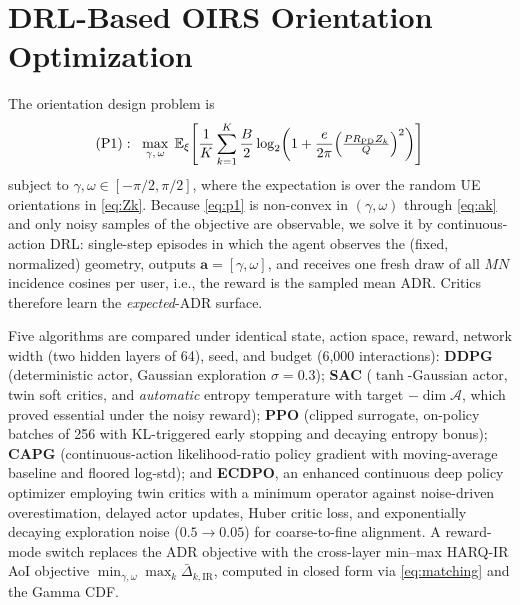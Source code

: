 \documentclass[conference]{IEEEtran}
\newcommand{\E}{\mathbb{E}}
\begin{document}
\section{DRL-Based OIRS Orientation Optimization}
The orientation design problem is
\begin{equation}
(\mathrm{P1}):\;\;
\max_{\gamma,\,\omega}\;
\E_{\xi}\!\left[\frac{1}{K}\sum_{k=1}^{K}
\frac{B}{2}\log_{2}\!\left(1+\frac{e}{2\pi}
\Bigl(\tfrac{P R_{\mathrm{PD}} Z_k}{Q}\Bigr)^{2}\right)\right]
\label{eq:p1}
\end{equation}
subject to $\gamma,\omega\in[-\pi/2,\pi/2]$, where the expectation is over
the random UE orientations in \eqref{eq:Zk}. Because \eqref{eq:p1} is
non-convex in $(\gamma,\omega)$ through \eqref{eq:ak} and only noisy samples
of the objective are observable, we solve it by continuous-action DRL:
single-step episodes in which the agent observes the (fixed, normalized)
geometry, outputs $\mathbf a=[\gamma,\omega]$, and receives one fresh draw of
all $MN$ incidence cosines per user, i.e., the reward is the sampled mean ADR.
Critics therefore learn the \emph{expected}-ADR surface.

Five algorithms are compared under identical state, action space, reward,
network width (two hidden layers of 64), seed, and budget (6{,}000
interactions): \textbf{DDPG} \cite{lillicrap2016} (deterministic actor,
Gaussian exploration $\sigma=0.3$); \textbf{SAC} \cite{haarnoja2018}
($\tanh$-Gaussian actor, twin soft critics, and \emph{automatic} entropy
temperature with target $-\dim\mathcal{A}$, which proved essential under the
noisy reward); \textbf{PPO} \cite{schulman2017} (clipped surrogate, on-policy
batches of 256 with KL-triggered early stopping and decaying entropy bonus);
\textbf{CAPG} (continuous-action likelihood-ratio policy gradient with
moving-average baseline and floored log-std); and \textbf{ECDPO}, an enhanced
continuous deep policy optimizer employing twin critics with a minimum
operator against noise-driven overestimation, delayed actor updates, Huber
critic loss, and exponentially decaying exploration noise
($0.5\!\to\!0.05$) for coarse-to-fine alignment. A reward-mode switch
replaces the ADR objective with the cross-layer min--max HARQ-IR AoI
objective $\min_{\gamma,\omega}\max_k \bar{\Delta}_{k,\mathrm{IR}}$,
computed in closed form via \eqref{eq:matching} and the Gamma CDF.
\end{document}
